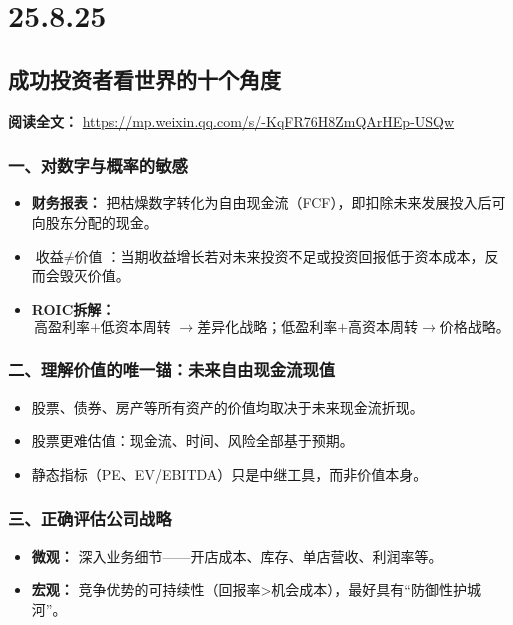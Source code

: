 \chapter{25.8.25}
\section{成功投资者看世界的十个角度}
\vspace{1em}
\noindent\textbf{阅读全文：} \url{https://mp.weixin.qq.com/s/-KqFR76H8ZmQArHEp-USQw}

\subsection{一、对数字与概率的敏感}

\begin{itemize}
  \item \textbf{财务报表：} 把枯燥数字转化为自由现金流（FCF），即扣除未来发展投入后可向股东分配的现金。
  \item $\textbf{收益}  \neq \textbf{价值}$：当期收益增长若对未来投资不足或投资回报低于资本成本，反而会毁灭价值。
  \item \textbf{ROIC拆解：} 
\[
\text{高盈利率+低资本周转 } \rightarrow \text{差异化战略；} \text{低盈利率+高资本周转} \rightarrow \text{价格战略。} 
\]
\end{itemize}

\subsection{二、理解价值的唯一锚：未来自由现金流现值}

\begin{itemize}
  \item 股票、债券、房产等所有资产的价值均取决于未来现金流折现。
  \item 股票更难估值：现金流、时间、风险全部基于预期。
  \item 静态指标（PE、EV/EBITDA）只是中继工具，而非价值本身。
\end{itemize}

\subsection{三、正确评估公司战略}

\begin{itemize}
  \item \textbf{微观：} 深入业务细节——开店成本、库存、单店营收、利润率等。
  \item \textbf{宏观：} 竞争优势的可持续性（回报率>机会成本），最好具有“防御性护城河”。
\end{itemize}

